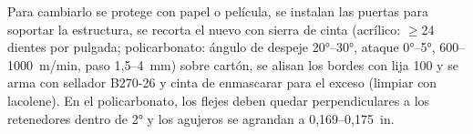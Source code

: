 Para cambiarlo se protege con papel o película, se instalan las puertas para soportar la estructura, se recorta el nuevo con sierra de cinta (acrílico: $\ge$24 dientes por pulgada; policarbonato: ángulo de despeje 20°--30°, ataque 0°--5°, 600--1000~m/min, paso 1,5--4~mm) sobre cartón, se alisan los bordes con lija 100 y se arma con sellador B270-26 y cinta de enmascarar para el exceso (limpiar con lacolene). En el policarbonato, los flejes deben quedar perpendiculares a los retenedores dentro de 2° y los agujeros se agrandan a 0,169--0,175~in.
